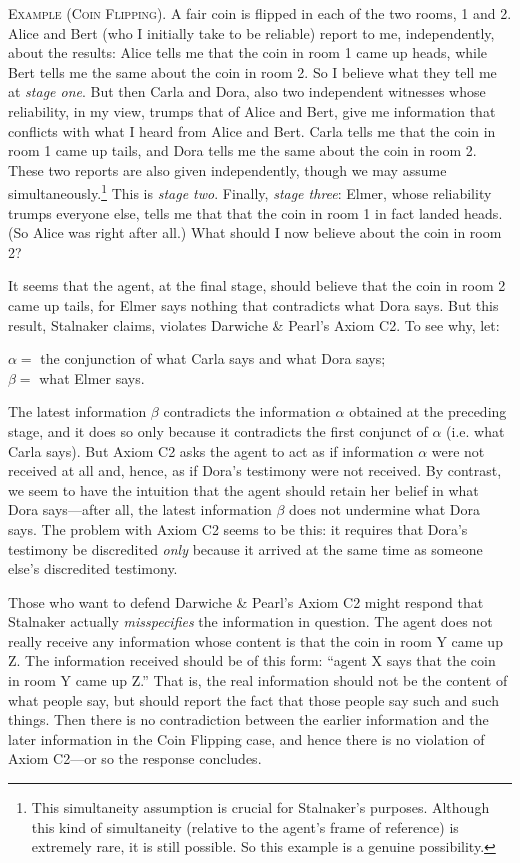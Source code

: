 	\xm \textsc{Example (Coin Flipping).} 
	A fair coin is flipped in each of the two rooms, 1 and 2. Alice and Bert (who I initially take to be reliable) report to me, independently, about the results: Alice tells me that the coin in room 1 came up heads, while Bert tells me the same about the coin in room 2. So I believe what they tell me at {\em stage one}. But then Carla and Dora, also two independent witnesses whose reliability, in my view, trumps that of Alice and Bert, give me information that conflicts with what I heard from Alice and Bert. Carla tells me that the coin in room 1 came up tails, and Dora tells me the same about the coin in room 2. These two reports are also given independently, though we may assume simultaneously.\footnote
		{This simultaneity assumption is crucial for Stalnaker's purposes. Although this kind of simultaneity (relative to the agent's frame of reference) is extremely rare, it is still possible. So this example is a genuine possibility.}
	This is {\em stage two}. Finally, {\em stage three}: Elmer, whose reliability trumps everyone else, tells me that that the coin in room 1 in fact landed heads. (So Alice was right after all.) What should I now believe about the coin in room 2?

\ed It seems that the agent, at the final stage, should believe that the coin in room 2 came up tails, for Elmer says nothing that contradicts what Dora says. But this result, Stalnaker claims, violates Darwiche \& Pearl's Axiom C2. To see why, let: \op

	\xm $\alpha =$ the conjunction of what Carla says and what Dora says;
	\\ $\beta = $ what Elmer says.

\ed The latest information $\beta$ contradicts the information $\alpha$ obtained at the preceding stage, and it does so only because it contradicts the first conjunct of $\alpha$ (i.e. what Carla says). But Axiom C2 asks the agent to act as if information $\alpha$ were not received at all and, hence, as if Dora's testimony were not received. By contrast, we seem to have the intuition that the agent should retain her belief in what Dora says---after all, the latest information $\beta$ does not undermine what Dora says. The problem with Axiom C2 seems to be this: it requires that Dora's testimony be discredited {\em only} because it arrived at the same time as someone else's discredited testimony.

Those who want to defend Darwiche \& Pearl's Axiom C2 might respond that Stalnaker actually {\em misspecifies} the information in question. The agent does not really receive any information whose content is that the coin in room Y came up Z. The information received should be of this form: ``agent X says that the coin in room Y came up Z.'' That is, the real information should not be the content of what people say, but should report the fact that those people say such and such things. Then there is no contradiction between the earlier information and the later information in the Coin Flipping case, and hence there is no violation of Axiom C2---or so the response concludes.

